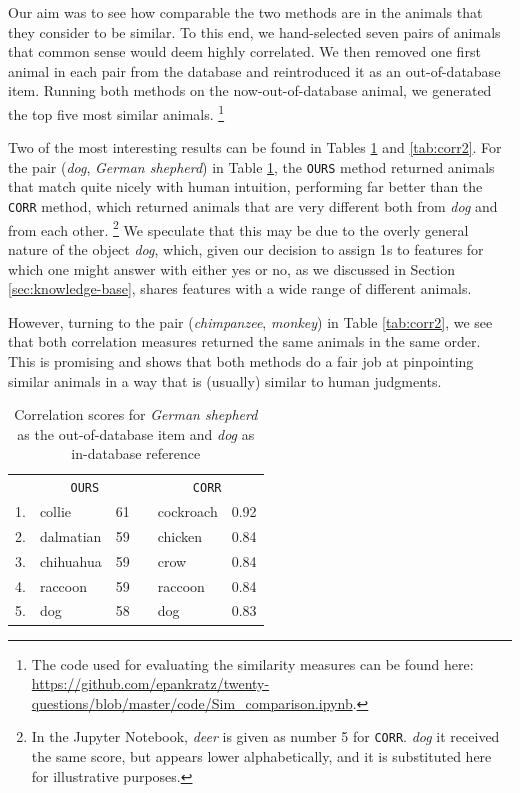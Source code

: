 \documentclass[11pt,a4paper]{article}
\begin{document}
Our aim was to see how comparable the two methods are in the animals that they consider to be similar.
To this end, we hand-selected seven pairs of animals that common sense would deem highly correlated.
We then removed one first animal in each pair from the database and reintroduced it as an out-of-database item. 
Running both methods on the now-out-of-database animal, we generated the top five most similar animals.%
    \footnote{The code used for evaluating the similarity measures can be found here: \url{https://github.com/epankratz/twenty-questions/blob/master/code/Sim_comparison.ipynb}.}

Two of the most interesting results can be found in Tables \ref{tab:corr1} and \ref{tab:corr2}.
For the pair (\textit{dog}, \textit{German shepherd}) in Table \ref{tab:corr1}, the \texttt{OURS} method returned animals that match quite nicely with human intuition, performing far better than the \texttt{CORR} method, which returned animals that are very different both from \textit{dog} and from each other.%
    \footnote{In the Jupyter Notebook, \textit{deer} is given as number 5 for \texttt{CORR}.
    \textit{dog} it received the same score, but appears lower alphabetically, and it is substituted here for illustrative purposes.}
We speculate that this may be due to the overly general nature of the object \textit{dog}, which, given our decision to assign 1s to features for which one might answer with either yes or no, as we discussed in Section \ref{sec:knowledge-base}, shares features with a wide range of different animals.

However, turning to the pair (\textit{chimpanzee}, \textit{monkey}) in Table \ref{tab:corr2}, we see that both correlation measures returned the same animals in the same order. 
This is promising and shows that both methods do a fair job at pinpointing similar animals in a way that is (usually) similar to human judgments.

\begin{table}[]
    \centering
    \begin{tabular}{clcclc}
    \toprule
    & \multicolumn{2}{c}{\texttt{OURS}} && \multicolumn{2}{c}{\texttt{CORR}} \\
    \cmidrule{2-3} \cmidrule{5-6}
    1. & collie & 61 && cockroach & 0.92 \\
    2. & dalmatian & 59 && chicken & 0.84 \\
    3. & chihuahua & 59 && crow & 0.84 \\
    4. & raccoon & 59 && raccoon & 0.84 \\
    5. & dog & 58 && dog & 0.83 \\
    \bottomrule
    \end{tabular}
\caption{Correlation scores for \textit{German shepherd} as the out-of-database item and \textit{dog} as in-database reference}
\label{tab:corr1}
\end{table}
\end{document}
